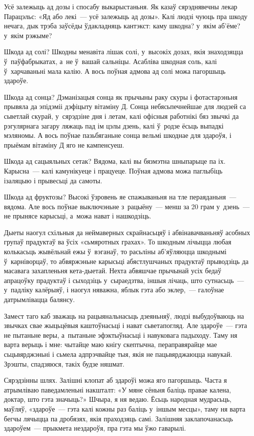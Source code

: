 Усё залежыць ад дозы і спосабу выкарыстаньня. Як казаў сярэднявечны лекар Парацэльс: «Яд або лекі~--- усё залежыць ад дозы». Калі людзі чуюць пра шкоду нечага, дык трэба заўсёды ўдакладняць кантэкст: каму шкодна? у~якім аб'ёме? у~якім рэжыме?

Шкода ад солі? Шкодны менавіта лішак солі, у~высокіх дозах, якія знаходзяцца ў~паўфабрыкатах, а~не ў~вашай сальніцы. Асабліва шкодная соль, калі ў~харчаваньні мала калію. А вось поўная адмова ад солі можа пагоршыць здароўе.

Шкода ад сонца? Дэманізацыя сонца як прычыны раку скуры і фотастарэньня прывяла да эпідэміі дэфіцыту вітаміну Д. Сонца небясьпечнейшае для людзей са сьветлай скурай, у~сярэдзіне дня і летам, калі офісныя работнікі бяз звычкі да рэгулярнага загару ляжаць пад ім цэлы дзень, калі ў~родзе ёсьць выпадкі мэляномы. А вось поўнае пазьбяганьне сонца вельмі шкоднае для здароўя, і прыёмам вітаміну Д яго не кампенсуеш.

Шкода ад сацыяльных сетак? Вядома, калі вы бязмэтна шныпарыце па іх. Карысна~--- калі камунікуеце і працуеце. Поўная адмова можа паглыбіць ізаляцыю і прывесьці да самоты.

Шкода ад фруктозы? Высокі ўзровень яе спажываньня на тле пераяданьня~--- вядома. Але вось поўнае выключэньне з~рацыёну~--- менш за 20 грам у~дзень~--- не прынясе карысьці, а~можа нават і нашкодзіць.

Дыеты наогул схільныя да неймаверных скрайнасьцяў і абвінавачваньняў асобных групаў прадуктаў ва ўсіх «сьмяротных грахах». То шкодным лічыцца любая колькасьць жывёльнай ежы ў~вэганаў, то расьліны аб'яўляюцца шкоднымі ў~карніворцаў, то абвяржэньне карысьці абястлушчаных прадуктаў прыводзіць да масавага захапленьня кета-дыетай. Нехта абвяшчае прычынай усіх бедаў апрацоўку прадуктаў і сыходзіць у~сыраедзтва, іншыя лічаць, што сутнасьць~--- у~падліку калёрыяў, і наогул няважна, яблык гэта або эклер,~--- галоўнае датрымлівацца балянсу.

Замест таго каб зважаць на рацыянальнасьць дзеяньняў, людзі выбудоўваюць на звычках свае жыцьцёвыя каштоўнасьці і нават сьветапогляд. Але здароўе~--- гэта не пытаньне веры, а~пытаньне эфэктыўнасьці і навуковага падыходу. Таму ня варта верыць і мне: чытайце маю кнігу скептычна, пераправярайце мае сьцьвярджэньні і сьмела адпрэчвайце тыя, якія не пацьвярджаюцца навукай. Зрэшты, спадзяюся, такіх будзе няшмат.

Сярэдзінны шлях. Залішні клопат аб здароўі можа яго пагоршыць. Часта я атрымліваю паведамленьні накшталт: «У мяне сёньня баліць правае калена, доктар, што гэта значыць?» Шчыра, я ня ведаю. Ёсьць народная мудрасьць, маўляў, «здароўе~--- гэта калі кожны раз баліць у~іншым месцы», таму ня варта бегчы лячыцца па дробязях, якія праходзяць самі. Залішняя заклапочанасьць здароўем~--- прыкмета нездароўя, пра гэта мы ўжо гаварылі.

